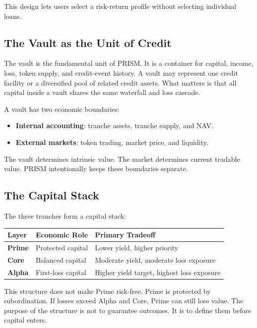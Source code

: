 \documentclass[11pt]{article}
\begin{document}
This design lets users select a risk-return profile without selecting individual
loans.

\subsection{The Vault as the Unit of Credit}

The vault is the fundamental unit of PRISM. It is a container for capital,
income, loss, token supply, and credit-event history. A vault may represent one
credit facility or a diversified pool of related credit assets. What matters is
that all capital inside a vault shares the same waterfall and loss cascade.

A vault has two economic boundaries:

\begin{itemize}
  \item \textbf{Internal accounting}: tranche assets, tranche supply, and NAV.
  \item \textbf{External markets}: token trading, market price, and liquidity.
\end{itemize}

The vault determines intrinsic value. The market determines current tradable
value. PRISM intentionally keeps these boundaries separate.

\subsection{The Capital Stack}

The three tranches form a capital stack:

\begin{center}
\begin{tabular}{>{\bfseries}p{}p{}p{}}
\toprule
Layer & Economic Role & Primary Tradeoff \\
\midrule
Prime & Protected capital & Lower yield, higher priority \\
Core & Balanced capital & Moderate yield, moderate loss exposure \\
Alpha & First-loss capital & Higher yield target, highest loss exposure \\
\bottomrule
\end{tabular}
\end{center}

This structure does not make Prime risk-free. Prime is protected by
subordination. If losses exceed Alpha and Core, Prime can still lose value. The
purpose of the structure is not to guarantee outcomes. It is to define them
before capital enters.
\end{document}
